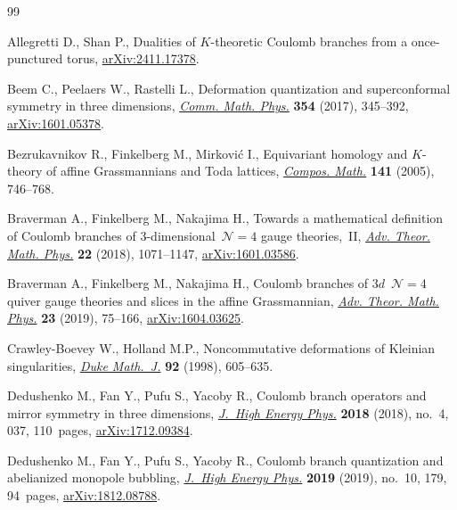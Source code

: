 \documentclass[pdftex]{sigma}
\numberwithin{equation}{section}
\theoremstyle{definition}
\begin{document}
\begin{thebibliography}{99}
\footnotesize\itemsep=0pt

Allegretti D., Shan P., Dualities of {$K$}-theoretic {C}oulomb branches from a
 once-punctured torus,
 \href{http://arxiv.org/abs/2411.17378}{arXiv:2411.17378}.

Beem C., Peelaers W., Rastelli L., Deformation quantization and superconformal
 symmetry in three dimensions,
 \href{https://doi.org/10.1007/s00220-017-2845-6}{\textit{Comm. Math. Phys.}}
 \textbf{354} (2017), 345--392,
 \href{http://arxiv.org/abs/1601.05378}{arXiv:1601.05378}.

Bezrukavnikov R., Finkelberg M., Mirkovi\'c I., Equivariant homology and
 {$K$}-theory of affine {G}rassmannians and {T}oda lattices,
 \href{https://doi.org/10.1112/S0010437X04001228}{\textit{Compos. Math.}}
 \textbf{141} (2005), 746--768.

Braverman A., Finkelberg M., Nakajima H., Towards a mathematical definition of
 {C}oulomb branches of 3-dimensional~{$\mathcal N=4$} gauge theories,~{II},
 \href{https://doi.org/10.4310/ATMP.2018.v22.n5.a1}{\textit{Adv. Theor. Math.
 Phys.}} \textbf{22} (2018), 1071--1147,
 \href{http://arxiv.org/abs/1601.03586}{arXiv:1601.03586}.

Braverman A., Finkelberg M., Nakajima H., Coulomb branches of {$3d$}~{$\mathcal
 N=4$} quiver gauge theories and slices in the affine {G}rassmannian,
 \href{https://doi.org/10.4310/ATMP.2019.v23.n1.a3}{\textit{Adv. Theor. Math.
 Phys.}} \textbf{23} (2019), 75--166,
 \href{http://arxiv.org/abs/1604.03625}{arXiv:1604.03625}.

Crawley-Boevey W., Holland M.P., Noncommutative deformations of {K}leinian
 singularities,
 \href{https://doi.org/10.1215/S0012-7094-98-09218-3}{\textit{Duke Math.~J.}}
 \textbf{92} (1998), 605--635.

Dedushenko M., Fan Y., Pufu S., Yacoby R., Coulomb branch operators and mirror
 symmetry in three dimensions,
 \href{https://doi.org/10.1007/jhep04(2018)037}{\textit{J.~High Energy Phys.}}
 \textbf{2018} (2018), no.~4, 037, 110~pages,
 \href{http://arxiv.org/abs/1712.09384}{arXiv:1712.09384}.

Dedushenko M., Fan Y., Pufu S., Yacoby R., Coulomb branch quantization and
 abelianized monopole bubbling,
 \href{https://doi.org/10.1007/jhep10(2019)179}{\textit{J.~High Energy Phys.}}
 \textbf{2019} (2019), no.~10, 179, 94~pages,
 \href{http://arxiv.org/abs/1812.08788}{arXiv:1812.08788}.


\end{thebibliography}
\end{document}
